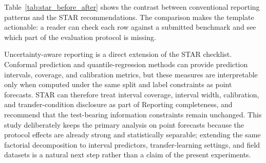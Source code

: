 \documentclass[pdflatex,sn-mathphys-num]{sn-jnl}
\begin{document}
Table~\ref{tab:star_before_after} shows the contrast between conventional reporting patterns and the STAR recommendations. The comparison makes the template actionable: a reader can check each row against a submitted benchmark and see which part of the evaluation protocol is missing.

Uncertainty-aware reporting is a direct extension of the STAR checklist. Conformal prediction and quantile-regression methods \cite{mst2024cqr,icsrs2023splitconformal,phme2026conformal,eaai2025explainable} can provide prediction intervals, coverage, and calibration metrics, but these measures are interpretable only when computed under the same split and label constraints as point forecasts. STAR can therefore treat interval coverage, interval width, calibration, and transfer-condition disclosure as part of Reporting completeness, and recommend that the test-bearing information constraints remain unchanged. This study deliberately keeps the primary analysis on point forecasts because the protocol effects are already strong and statistically separable; extending the same factorial decomposition to interval predictors, transfer-learning settings, and field datasets is a natural next step rather than a claim of the present experiments.

\begin{table}[t]
\centering
\caption{Conventional reporting patterns versus STAR recommendations.}
\label{tab:star_before_after}
\small
{}
\end{table}
\end{document}
